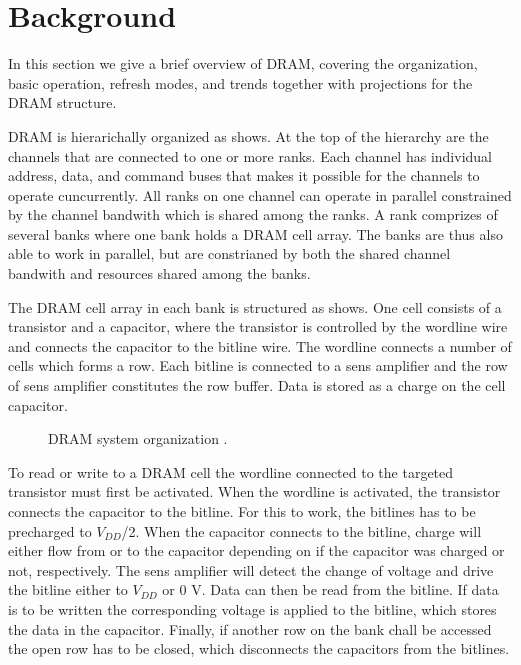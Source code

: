 \section{Background} 
\label{sec:bg}
In this section we give a brief overview of DRAM, covering the organization, basic operation, refresh modes, and trends together with projections for the DRAM structure.

DRAM is hierarichally organized as  shows. At the top of the hierarchy are the channels that are connected to one or more ranks. Each channel has individual address, data, and command buses that makes it possible for the channels to operate cuncurrently. All ranks on one channel can operate in parallel constrained by the channel bandwith which is shared among the ranks. A rank comprizes of several banks where one bank holds a DRAM cell array. The banks are thus also able to work in parallel, but are constrianed by both the shared channel bandwith and resources shared among the banks. 

The DRAM cell array in each bank is structured as  shows. One cell consists of a transistor and a capacitor, where the transistor is controlled by the wordline wire and connects the capacitor to the bitline wire. The wordline connects a number of cells which forms a row. Each bitline is connected to a sens amplifier and the row of sens amplifier constitutes the row buffer. Data is stored as a charge on the cell capacitor.

\begin{figure*}[t]
    \centering
	\caption{DRAM system organization \cite{raidr}.}
	\label{fig:dram_org}
\end{figure*}

To read or write to a DRAM cell the wordline connected to the targeted transistor must first be activated. When the wordline is activated, the transistor connects the capacitor to the bitline. For this to work, the bitlines has to be precharged to \(V_{DD}\)/2. When the capacitor connects to the bitline, charge will either flow from or to the capacitor depending on if the capacitor was charged or not, respectively. The sens amplifier will detect the change of voltage and drive the bitline either to \(V_{DD}\) or 0 V. Data can then be read from the bitline. If data is to be written the corresponding voltage is applied to the bitline, which stores the data in the capacitor. Finally, if another row on the bank chall be accessed the open row has to be closed, which disconnects the capacitors from the bitlines.

